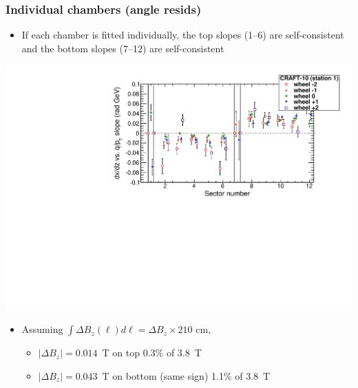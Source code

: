 \documentclass[compress]{beamer}
\begin{document}
\begin{frame}
\frametitle{Individual chambers (angle resids)}

\begin{itemize}
\item If each chamber is fitted individually, the top slopes (1--6) are
  self-consistent and the bottom slopes (7--12) are self-consistent
\end{itemize}

\includegraphics[width=0.8\linewidth]{bfield_dxdz_craft10_slopes_nosignswitch.pdf}

\begin{itemize}
\item Assuming $\displaystyle \int \Delta B_z(\ell) d\ell = \Delta B_z \times \mbox{210~cm}$,
\begin{itemize}
\item $| \Delta B_z| = 0.014$~T on top \hfill 0.3\% of 3.8~T
\item $| \Delta B_z| = 0.043$~T on bottom (same sign) \hfill 1.1\% of 3.8~T
\end{itemize}
\end{itemize}
\end{frame}
\end{document}
